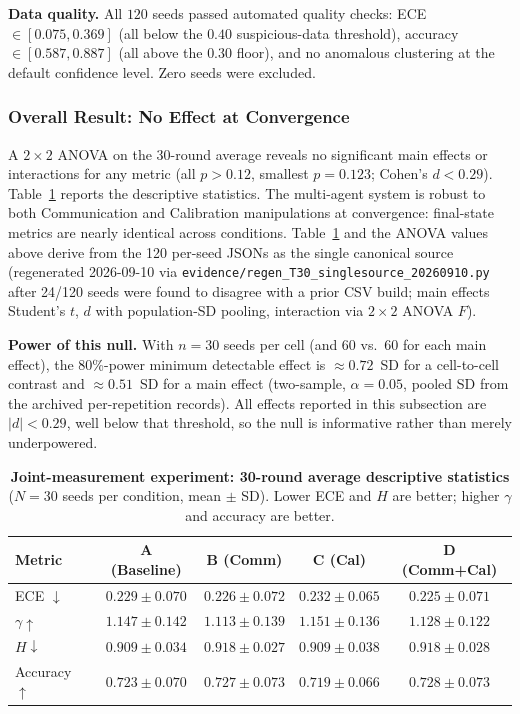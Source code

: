 \documentclass[11pt]{article}
\theoremstyle{definition}
\theoremstyle{remark}
\begin{document}
\textbf{Data quality.} All $120$ seeds passed automated quality checks: ECE $\in [0.075, 0.369]$ (all below the $0.40$ suspicious-data threshold), accuracy $\in [0.587, 0.887]$ (all above the $0.30$ floor), and no anomalous clustering at the default confidence level. Zero seeds were excluded.

\subsubsection{Overall Result: No Effect at Convergence}

A $2 \times 2$ ANOVA on the 30-round average reveals no significant main effects or interactions for any metric (all $p > 0.12$, smallest $p = 0.123$; Cohen's $d < 0.29$). Table~\ref{tab:joint_overall} reports the descriptive statistics. The multi-agent system is robust to both Communication and Calibration manipulations at convergence: final-state metrics are nearly identical across conditions. Table~\ref{tab:joint_overall} and the ANOVA values above derive from the 120 per-seed JSONs as the single canonical source (regenerated 2026-09-10 via \texttt{evidence/regen\_T30\_singlesource\_20260910.py} after 24/120 seeds were found to disagree with a prior CSV build; main effects Student's $t$, $d$ with population-SD pooling, interaction via $2{\times}2$ ANOVA $F$).

\textbf{Power of this null.} With $n{=}30$ seeds per cell (and $60$ vs.\ $60$ for each main effect), the 80\%-power minimum detectable effect is ${\approx}0.72$~SD for a cell-to-cell contrast and ${\approx}0.51$~SD for a main effect (two-sample, $\alpha{=}0.05$, pooled SD from the archived per-repetition records). All effects reported in this subsection are $|d|{<}0.29$, well below that threshold, so the null is informative rather than merely underpowered.

\begin{table}[H]
\centering
\caption{\textbf{Joint-measurement experiment: 30-round average descriptive statistics} ($N{=}30$ seeds per condition, mean $\pm$ SD). Lower ECE and $H$ are better; higher $\gamma$ and accuracy are better.}
\label{tab:joint_overall}
\begin{tabular}{@{}lcccc@{}}
\toprule
Metric & A (Baseline) & B (Comm) & C (Cal) & D (Comm+Cal) \\
\midrule
ECE $\downarrow$ & $0.229 \pm 0.070$ & $0.226 \pm 0.072$ & $0.232 \pm 0.065$ & $0.225 \pm 0.071$ \\
$\gamma \uparrow$ & $1.147 \pm 0.142$ & $1.113 \pm 0.139$ & $1.151 \pm 0.136$ & $1.128 \pm 0.122$ \\
$H \downarrow$ & $0.909 \pm 0.034$ & $0.918 \pm 0.027$ & $0.909 \pm 0.038$ & $0.918 \pm 0.028$ \\
Accuracy $\uparrow$ & $0.723 \pm 0.070$ & $0.727 \pm 0.073$ & $0.719 \pm 0.066$ & $0.728 \pm 0.073$ \\
\bottomrule
\end{tabular}
\end{table}
\end{document}
